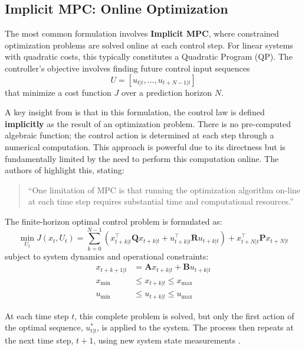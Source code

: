 \subsection{Implicit MPC: Online Optimization}

The most common formulation involves \textbf{Implicit MPC}, where constrained optimization problems are solved online at each control step. For linear systems with quadratic costs, this typically constitutes a Quadratic Program (QP). The controller's objective involves finding future control input sequences 
\[
U = [u_{t|t}, \dots, u_{t+N-1|t}]
\] 
that minimize a cost function $J$ over a prediction horizon $N$.

A key insight from \cite{borrelli2017predictive} is that in this formulation, the control law is defined \textbf{implicitly} as the result of an optimization problem. There is no pre-computed algebraic function; the control action is determined at each step through a numerical computation. This approach is powerful due to its directness but is fundamentally limited by the need to perform this computation online. The authors of \cite{borrelli2017predictive} highlight this, stating: 
\begin{quote}
“One limitation of MPC is that running the optimization algorithm on-line at each time step requires substantial time and computational resources.”
\end{quote}

The finite-horizon optimal control problem is formulated as:
\begin{equation}
\min_{U_t} J(x_t, U_t) = \sum_{k=0}^{N-1} \left( x_{t+k|t}^\top \mathbf{Q} x_{t+k|t} + u_{t+k|t}^\top \mathbf{R} u_{t+k|t} \right) + x_{t+N|t}^\top \mathbf{P} x_{t+N|t}
\end{equation}
subject to system dynamics and operational constraints:
\begin{subequations}
\begin{align}
x_{t+k+1|t} &= \mathbf{A} x_{t+k|t} + \mathbf{B} u_{t+k|t} \\
x_{\min} &\leq x_{t+k|t} \leq x_{\max} \\
u_{\min} &\leq u_{t+k|t} \leq u_{\max}
\end{align}
\end{subequations}

At each time step $t$, this complete problem is solved, but only the first action of the optimal sequence, $u_{t|t}^*$, is applied to the system. The process then repeats at the next time step, $t+1$, using new system state measurements \cite{camacho2013model}.


